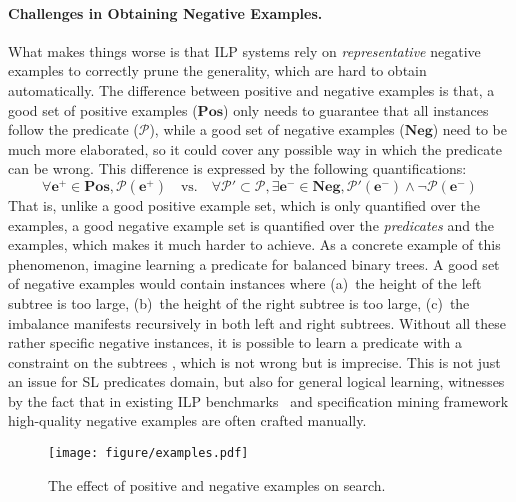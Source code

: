 \paragraph{Challenges in Obtaining Negative Examples.}
What makes things worse is that ILP systems rely on
\emph{representative} negative examples to correctly prune the
generality, which are hard to obtain automatically.
%
%
The difference between positive and negative examples is that, a good
set of positive examples (\(\mathbf{Pos}\)) only needs to guarantee
that all instances follow the predicate (\(\mathcal{P}\)), while a
good set of negative examples (\(\mathbf{Neg}\)) need to be much more
elaborated, so it could cover any possible way in which the predicate
can be wrong. This difference is expressed by the following
quantifications:
\[
  \forall \mathbf{e^+} \in \mathbf{Pos}, \mathcal{P}(\mathbf{e^+})
  \quad \text{vs.} \quad
  \forall \mathcal{P'} \subset \mathcal{P}, \exists \mathbf{e^-} \in \mathbf{Neg},  \mathcal{P'}(\mathbf{e^-}) \land \neg\mathcal{P}(\mathbf{e^-})
\]
That is, unlike a good positive example set, which is only quantified
over the examples, a good negative example set is quantified over the
\emph{predicates} and the examples, which makes it much harder to
achieve. As a concrete example of this phenomenon, imagine learning a
predicate for balanced binary trees.
%
A good set of negative examples would contain instances where
(a)~the height of the left subtree is too large, (b)~the height of the
right subtree is too large, (c)~the imbalance manifests recursively in
both left and right subtrees.
%
Without all these rather specific negative instances, it is possible
to learn a predicate with a constraint on the subtrees
, which is not wrong but is
imprecise. This is not just an issue for SL predicates domain, but
also for general logical learning, witnesses by the fact that in
existing ILP benchmarks~\cite{cropper2021learning,thakkar2021example}
and specification mining framework \cite{10.1145/3622876} high-quality
negative examples are often crafted manually.

\begin{figure}[t]
  \centering
  \texttt{[image: figure/examples.pdf]}
  \caption{The effect of positive and negative examples on search.}
      \label{fig:illustration}
\end{figure}


